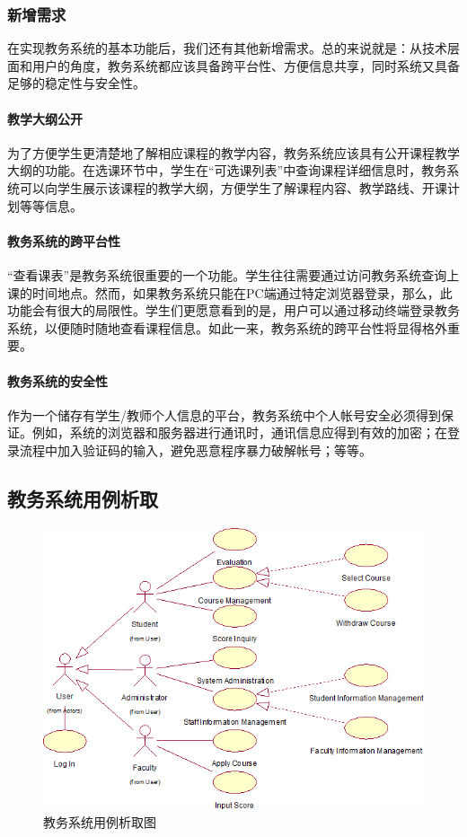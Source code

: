 \subsubsection{新增需求}
在实现教务系统的基本功能后，我们还有其他新增需求。总的来说就是：从技术层面和用户的角度，教务系统都应该具备跨平台性、方便信息共享，同时系统又具备足够的稳定性与安全性。

\paragraph{教学大纲公开}

为了方便学生更清楚地了解相应课程的教学内容，教务系统应该具有公开课程教学大纲的功能。在选课环节中，学生在“可选课列表”中查询课程详细信息时，教务系统可以向学生展示该课程的教学大纲，方便学生了解课程内容、教学路线、开课计划等等信息。
    
\paragraph{教务系统的跨平台性}
    
“查看课表”是教务系统很重要的一个功能。学生往往需要通过访问教务系统查询上课的时间地点。然而，如果教务系统只能在PC端通过特定浏览器登录，那么，此功能会有很大的局限性。学生们更愿意看到的是，用户可以通过移动终端登录教务系统，以便随时随地查看课程信息。如此一来，教务系统的跨平台性将显得格外重要。
    
\paragraph{教务系统的安全性}
    
作为一个储存有学生/教师个人信息的平台，教务系统中个人帐号安全必须得到保证。例如，系统的浏览器和服务器进行通讯时，通讯信息应得到有效的加密；在登录流程中加入验证码的输入，避免恶意程序暴力破解帐号；等等。

\subsection{教务系统用例析取}
\begin{figure}[H]
   \centering \includegraphics[width=\textwidth]{img/jwxt_usecases.png}
   \caption{教务系统用例析取图}
\end{figure}

